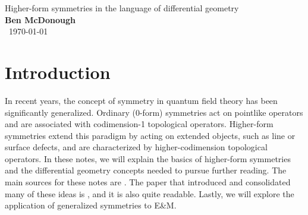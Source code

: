 \documentclass[11pt]{article}
\begin{document}
\noindent\Large{Higher-form symmetries in the language of differential geometry} \\
\normalsize{\textbf{Ben McDonough}}\\\
\normalsize{\today}

\tableofcontents

\section{Introduction}
In recent years, the concept of symmetry in quantum field theory has been significantly generalized. Ordinary (0-form) symmetries act on pointlike operators and are associated with codimension-1 topological operators. Higher-form symmetries extend this paradigm by acting on extended objects, such as line or surface defects, and are characterized by higher-codimension topological operators. In these notes, we will explain the basics of higher-form symmetries and the differential geometry concepts needed to pursue further reading. The main sources for these notes are \cite{luo2024lecture, brennan2023introductiongeneralizedglobalsymmetries}. The paper that introduced and consolidated many of these ideas is \cite{Gaiotto_2015}, and it is also quite readable.
Lastly, we will explore the application of generalized symmetries to E\&M.
\end{document}
